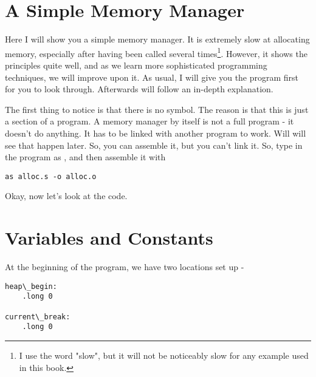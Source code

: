 
\section{A Simple Memory Manager}

Here I will show you a simple memory manager.  It is extremely slow at allocating memory,
especially after having been called several times\footnote{I use the word "slow", but 
it will not be noticeably slow for any example used in this book.}.  However, it shows the principles quite
well, and as we learn more sophisticated programming techniques, we will improve upon it.
As usual, I will give you the program first for you to look through.  Afterwards will follow
an in-depth explanation.

\begin{simpletyping}

\end{simpletyping}

The first thing to notice is that there is no  symbol.  The reason
is that this is just a section of a program.  A memory manager by itself is not a full 
program - it doesn't do anything.  It has to be linked with another program to work.  Will
will see that happen later.  So, you can assemble it, but you can't link it.  So, type in
the program as , and then assemble it with

\begin{simpletyping}
\begin{lstlisting}
as alloc.s -o alloc.o
\end{lstlisting}
\end{simpletyping}

Okay, now let's look at the code.

\section{Variables and Constants}

At the beginning of the program, we have two locations set up -

\begin{simpletyping}
\begin{lstlisting}
heap\_begin:
	.long 0

current\_break:
	.long 0
\end{lstlisting}
\end{simpletyping}

